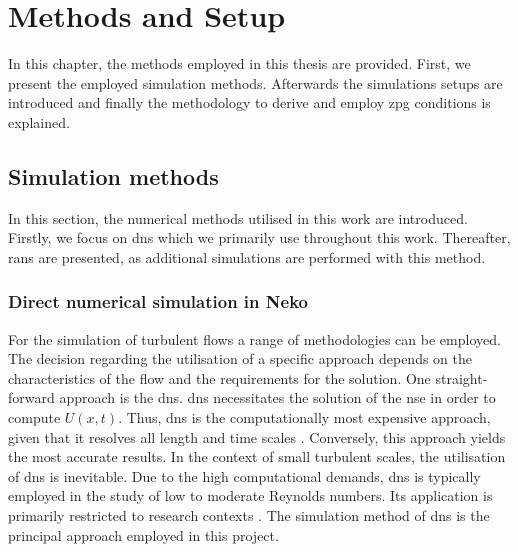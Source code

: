 
\chapter{Methods and Setup} \label{chap:methods and Setup}



In this chapter, the methods employed in this thesis are provided. 
First, we present the employed simulation methods.
Afterwards the simulations setups are introduced and finally the methodology to derive and employ \acrshort{zpg} conditions is explained. 

\section{Simulation methods}\label{sec:SimMethods}
In this section, the numerical methods utilised in this work are introduced.
Firstly, we focus on \acrfull{dns} which we primarily use throughout this work.
Thereafter, \acrfull{rans} are presented, as additional simulations are performed with this method.
\subsection{Direct numerical simulation in Neko}\label{subsec:DNSmethod}

For the simulation of turbulent flows a range of methodologies can be employed.
The decision regarding the utilisation of a specific approach  depends on the characteristics of the flow and the requirements for the solution.
One straight-forward approach is the \acrshort{dns}.
\acrshort{dns} necessitates the solution of the \acrshort{nse} in order to compute  $U(x,t)$.
Thus, \acrshort{dns} is the computationally most expensive approach, given that it resolves all length and time scales \citep{pope_turbulent_2015}. 
Conversely, this approach yields  the most accurate results.
In the context of small turbulent scales, the utilisation of \acrshort{dns} is inevitable.
Due to the high computational demands, \acrshort{dns} is typically employed in the study of low to moderate Reynolds numbers. 
Its application is primarily restricted to  research contexts \citep{slotnick_cfd_nodate}.
The simulation method of \acrshort{dns} is the principal approach employed in this project.

